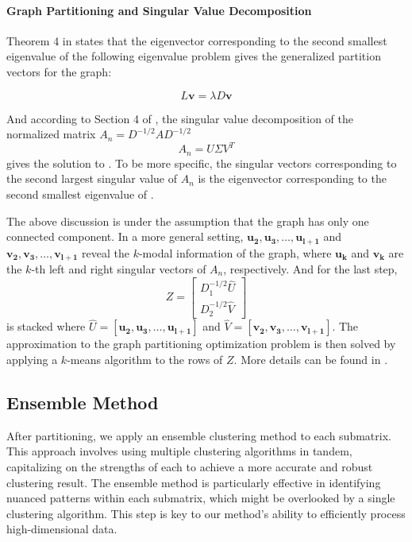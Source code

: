 \paragraph{Graph Partitioning and Singular Value Decomposition}
Theorem 4 in \cite{dhillon2001CoclusteringDocumentsWords} states that the eigenvector corresponding to the second smallest eigenvalue of the following eigenvalue problem gives the generalized partition vectors for the graph:

\begin{equation}
    L \mathbf{v} = \lambda D \mathbf{v}
    \label{eq:eigenvalue_problem}
\end{equation}

And according to Section 4 of \cite{dhillon2001CoclusteringDocumentsWords}, the singular value decomposition of the normalized matrix $A_n = D^{-1/2} A D^{-1/2}$
$$A_n = U \Sigma V^T$$
gives the solution to . To be more specific, the singular vectors corresponding to the second largest singular value of $A_n$ is the eigenvector corresponding to the second smallest eigenvalue of .

The above discussion is under the assumption that the graph has only one connected component. In a more general setting, $\mathbf{u_2}, \mathbf{u_3}, \ldots, \mathbf{u_{l+1}}$ and $\mathbf{v_2}, \mathbf{v_3}, \ldots, \mathbf{v_{l+1}}$ reveal the $k$-modal information of the graph, where $\mathbf{u_k}$ and $\mathbf{v_k}$ are the $k$-th left and right singular vectors of $A_n$, respectively.
And for the last step, 
$$ Z = \begin{bmatrix} D_1^{-1/2} \hat{U} \\ D_2^{-1/2} \hat{V} \end{bmatrix} $$
is stacked where $\hat{U} = [\mathbf{u_2}, \mathbf{u_3}, \ldots, \mathbf{u_{l+1}}]$ and $\hat{V} = [\mathbf{v_2}, \mathbf{v_3}, \ldots, \mathbf{v_{l+1}}]$. The approximation to the graph partitioning optimization problem is then solved by applying a $k$-means algorithm to the rows of $Z$. More details can be found in \cite{dhillon2001CoclusteringDocumentsWords}.

\subsection{Ensemble Method}
After partitioning, we apply an ensemble clustering method to each submatrix. This approach involves using multiple clustering algorithms in tandem, capitalizing on the strengths of each to achieve a more accurate and robust clustering result. The ensemble method is particularly effective in identifying nuanced patterns within each submatrix, which might be overlooked by a single clustering algorithm. This step is key to our method's ability to efficiently process high-dimensional data.

